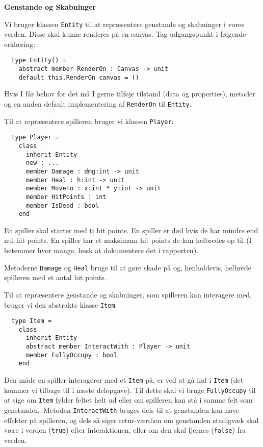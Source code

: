 \textbf{Genstande og Skabninger}

Vi bruger klassen \lstinline{Entity} til at repræsentere genstande og skabninger
i vores verden. Disse skal kunne renderes på en canvas. Tag udgangspunkt i
følgende erklæring:

\begin{lstlisting}
  type Entity() =
    abstract member RenderOn : Canvas -> unit
    default this.RenderOn canvas = ()
\end{lstlisting}

Hvis I får behov for det må I gerne tilføje tilstand (data og
properties), metoder og en anden default implementering af
\lstinline{RenderOn} til \lstinline{Entity}.

Til at repræsentere spilleren bruger vi klassen \lstinline{Player}:

\begin{lstlisting}
  type Player =
    class
      inherit Entity
      new : ...
      member Damage : dmg:int -> unit
      member Heal : h:int -> unit
      member MoveTo : x:int * y:int -> unit
      member HitPoints : int
      member IsDead : bool
    end
\end{lstlisting}

En spiller skal starter med ti hit points. En
spiller er død hvis de har mindre end nul hit points. En spiller
har et maksimum hit points de kan helbredes op til (I betemmer
hvor mange, husk at dokumentere det i rapporten).

Metoderne \lstinline{Damage} og \lstinline{Heal} bruge til at gøre
skade på og, henholdsvis, helbrede spilleren med et antal hit points.

Til at repræsentere genstande og skabninger, som spilleren kan
interagere med, bruger vi den abstrakte klasse \lstinline{Item}:

\begin{lstlisting}
  type Item =
    class
      inherit Entity
      abstract member InteractWith : Player -> unit
      member FullyOccupy : bool
    end
\end{lstlisting}

Den måde en spiller interagerer med et \lstinline{Item} på, er ved at
gå ind i \lstinline{Item} (det kommer vi tilbage til i næste
delopgave). Til dette skal vi bruge \lstinline{FullyOccupy} til at
sige om \lstinline{Item} fylder feltet helt ud eller om spilleren kan
stå i samme felt som genstanden. Metoden \lstinline{InteractWith}
bruges dels til at genstanden kan have effekter på spilleren, og dels
så siger retur-værdien om genstanden stadigvæk skal være i verden
(\lstinline{true}) efter interaktionen, eller om den skal fjernes
(\lstinline{false}) fra verden.

